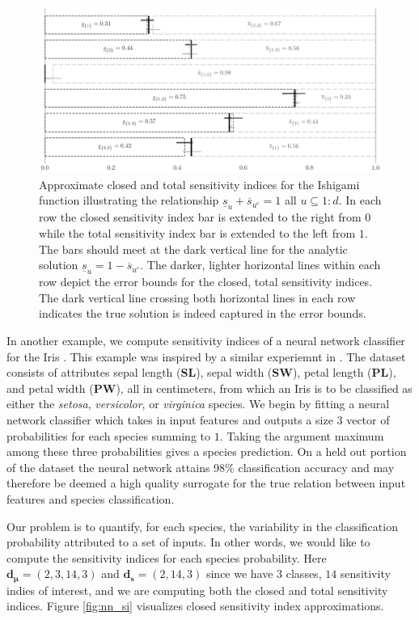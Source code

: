 \documentclass[graybox]{svmult}
\begin{document}
\begin{figure}[t]
    \centering
    \includegraphics[width=.8\textwidth]{figs/ishigami.pdf}
    \caption{Approximate closed and total sensitivity indices for the Ishigami function illustrating the relationship $\underline{s}_u + \overline{s}_{u^c} = 1$ all $u \subseteq 1:d$. In each row the closed sensitivity index bar is  extended to the right from $0$ while the total sensitivity index bar is extended to the left from $1$. The bars should meet at the dark vertical line for the  analytic solution $\underline{s}_u=1-\overline{s}_{u^c}$. The darker, lighter horizontal lines within each row depict the error bounds for the closed, total sensitivity indices. The dark vertical line crossing both horizontal lines in each row indicates the true solution is indeed captured in the error bounds.}
    \label{fig:ishigami}
\end{figure}

In another example, we compute sensitivity indices of a neural network classifier for the Iris \cite{uci_ml_repo}. This example was inspired by a similar experiemnt in \cite{hoyt2021efficient}. The dataset consists of attributes sepal length (\textbf{SL}), sepal width (\textbf{SW}), petal length (\textbf{PL}), and petal width (\textbf{PW}), all in centimeters, from which an Iris is to be classified as either the \emph{setosa}, \emph{versicolor}, or \emph{virginica} species. We begin by fitting a neural network classifier \cite{he2015delving} which takes in input features and outputs a size $3$ vector of probabilities for each species summing to $1$. Taking the argument maximum among these three probabilities gives a species prediction. On a held out portion of the dataset the neural network attains 98\% classification accuracy and may therefore be deemed a high quality surrogate for the true relation between input features and species classification. 

Our problem is to quantify, for each species, the variability in the classification probability attributed to a set of inputs. In other words, we would like to compute the sensitivity indices for each species probability. 
Here $\boldsymbol{d}_{\boldsymbol{\mu}} = (2,3,14,3)$ and $\boldsymbol{d}_{\boldsymbol{s}} = (2,14,3)$ since we have $3$ classes, $14$ sensitivity indies of interest, and we are computing both the closed and total sensitivity indices. Figure \ref{fig:nn_si} visualizes closed sensitivity index approximations. 
%
\end{document}
